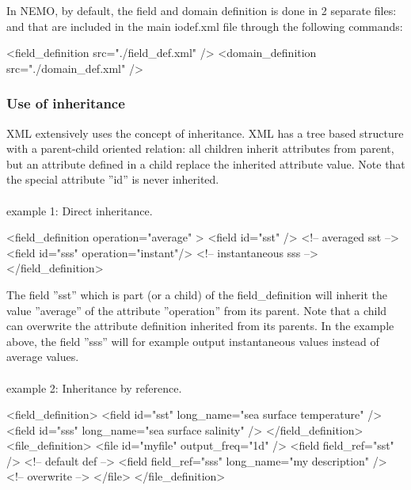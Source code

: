 \documentclass[../main/NEMO_manual]{subfiles}
\begin{document}
\noindent In NEMO, by default, the field and domain definition is done in 2 separate files:
 and  that
are included in the main iodef.xml file through the following commands:
\begin{xmllines}
<field_definition src="./field_def.xml" />
<domain_definition src="./domain_def.xml" />
\end{xmllines}

\subsubsection{Use of inheritance}

XML extensively uses the concept of inheritance.
XML has a tree based structure with a parent-child oriented relation: all children inherit attributes from parent,
but an attribute defined in a child replace the inherited attribute value.
Note that the special attribute ''id'' is never inherited.
\\
\\
example 1: Direct inheritance.

\begin{xmllines}
<field_definition operation="average" >
	<field id="sst"                    />   <!-- averaged      sst --> 
	<field id="sss" operation="instant"/>   <!-- instantaneous sss --> 
</field_definition> 
\end{xmllines}

The field ''sst'' which is part (or a child) of the field\_definition will inherit the value ''average'' of
the attribute ''operation'' from its parent.
Note that a child can overwrite the attribute definition inherited from its parents.
In the example above, the field ''sss'' will for example output instantaneous values instead of average values.
\\
\\
example 2: Inheritance by reference.

\begin{xmllines}
<field_definition>
	<field id="sst" long_name="sea surface temperature" />
	<field id="sss" long_name="sea surface salinity"    />
</field_definition>
<file_definition>
	<file id="myfile" output_freq="1d" />   
		<field field_ref="sst"                            />  <!-- default def -->
		<field field_ref="sss" long_name="my description" />  <!-- overwrite   -->
	</file>
</file_definition> 
\end{xmllines}
\end{document}
